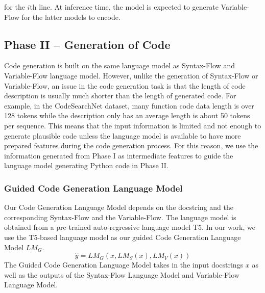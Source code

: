 \documentclass[11pt]{article}
\begin{document}
for the $i$th line. At inference time, the model is expected to generate Variable-Flow for the latter models to encode.





\subsection{Phase II -- Generation of Code}
Code generation is built on the same language model as Syntax-Flow and Variable-Flow language model. However, unlike the generation of Syntax-Flow or Variable-Flow, an issue in the code generation task is that the length of code description is usually much shorter than the length of generated code.
For example, in the CodeSearchNet dataset, many function code data length is over 128 tokens while the description only has an average length is about 50 tokens per sequence. This means that the input information is limited and not enough to generate plausible code unless the language model is available to have more prepared features during the code generation process.
For this reason, we use the information generated from Phase I as intermediate features to guide the language model generating Python code in Phase II.

\subsubsection{Guided Code Generation Language Model} 

Our Code Generation Language Model depends on the docstring and the corresponding Syntax-Flow and the Variable-Flow. The language model is obtained from a pre-trained auto-regressive language model T5. In our work, we use the T5-based language model as our guided Code Generation Language Model $LM_G $.
\begin{equation}
\hat{y} = LM_G(x, LM_S(x), LM_V(x))
\end{equation}
The Guided Code Generation Language Model takes in the input docstrings $x$ as well as the outputs of the Syntax-Flow Language Model and Variable-Flow Language Model. 
\end{document}

